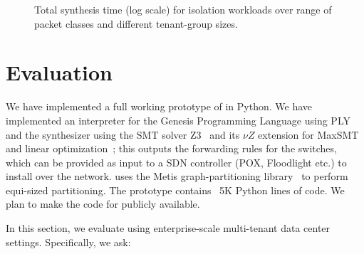 \begin{figure*}
	\centering
	\caption{\label{fig:isolation}
		Total synthesis time (log scale) for isolation workloads over range of packet classes and different tenant-group sizes.}
\end{figure*}

\section{Evaluation} \label{sec:evaluation}

 We have implemented a full working
prototype of \Name in Python. We have implemented an interpreter for
the Genesis Programming Language using PLY\cite{ply} and the synthesizer using 
the SMT solver Z3~\cite{z3} and its $\nu Z$ extension for MaxSMT and linear
 optimization~\cite{nuz3}; this outputs the
forwarding rules for the switches, which can be provided as input to a
SDN controller (POX, Floodlight etc.) to install over the
network. \Name uses the Metis graph-partitioning library~\cite{metis}
to perform equi-sized partitioning.  The prototype contains ~5K Python lines of code.  
We plan to make the code for \Name publicly available.

In this section, we evaluate \Name using
enterprise-scale multi-tenant data
center settings. 
Specifically, we ask:

